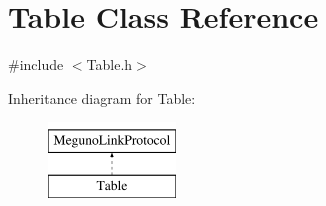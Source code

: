 \hypertarget{class_table}{\section{Table Class Reference}
\label{class_table}
}


{\ttfamily \#include $<$Table.\-h$>$}

Inheritance diagram for Table\-:\begin{figure}[H]
\begin{center}
\leavevmode
\includegraphics[height=2.000000cm]{class_table}
\end{center}
\end{figure}
